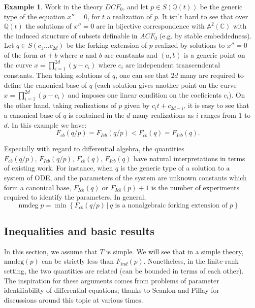 \documentclass[11pt]{amsart}
\def\nmdeg{\mathop{\rm nmdeg}}
\def\nmdeg{\operatorname{nmdeg}}
\newcommand{\fcb}[1]{F_{cb}\left( #1  \right)}
\newcommand{\ficb}[1]{F_{Icb}\left( #1  \right)}
\theoremstyle{definition}
\newtheorem{example}[theorem]{Example}
\theoremstyle{remark}
\newcommand{\m}{\mathbb }
\numberwithin{equation}{section}
\begin{document}
\begin{example}
Work in the theory $DCF_0$, and let $p \in S(\mathbb{Q}(t))$ be the generic type of the equation $x''=0$, for $t$ a realization of $p$. It isn't hard to see that over $\m Q(t)$   the solutions of $x''=0$ are in bijective correspondence with $\m A^2 (\m C)$ with the induced structure of subsets definable in $ACF_0$ (e.g. by stable embeddedness). Let $q \in S(c_{1} \ldots c_{2d})$ be the forking extension of $p$ realized by solutions to $x''=0$ of the form $at+b$ where $a$ and $b$ are constants and $(a,b)$ is a generic point on the curve $x=\prod_{i=1}^{2d} (y-c_i)$ where $c_i$ are independent transcendental constants. Then taking solutions of $q$, one can see that $2d$ many are required to define the canonical base of $q$ (each solution gives another point on the curve $x=\prod_{i=1}^{2d} (y-c_i)$ and imposes one linear condition on the coeficients $c_i$). On the other hand, taking realizations of $p$ given by $c_i t+ c_{2d-i}$, it is easy to see that a canonical base of $q$ is contained in the $d$ many realizations as $i$ ranges from $1$ to $d$. In this example we have:  $$\fcb{q/p}=\ficb{q/p} < \fcb{q} = \ficb{q}.$$

Especially with regard to differential algebra, the quantities $\fcb{q/p}, \, \ficb{q/p} , \, \fcb{q} , \, \ficb{q}$ have natural interpretations in terms of existing work. For instance, when $q$ is the generic type of a solution to a system of ODE, and the parameters of the system are unknown constants which form a canonical base, $\ficb{q}$ or $\ficb{p} +1 $ is the number of experiments required to identify the parameters. In general,
\begin{equation*}
\nmdeg {p} = \min \left\{  \fcb{q/p} \, | \, q \text{ is a nonalgebraic forking extension of } p \right\} 
\end{equation*}


\end{example}

\subsection{Inequalities and basic results} \label{basicineq}






In this section, we assume that $T$ is simple. We will see that in a simple theory, $\mathrm{nmdeg}(p)$ can be strictly less than $F_{ind}(p)$. Nonetheless, in the finite-rank setting, the two quantities are related (can be bounded in terms of each other). The inspiration for these arguments comes from problems of parameter identifiability of differential equations; thanks to Scanlon and Pillay for discussions around this topic at various times. %
\end{document}
